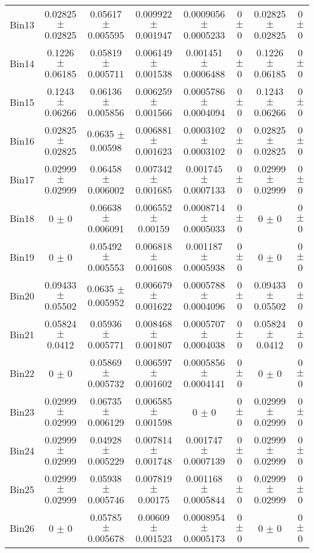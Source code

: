 \begin{tabular}{@{\extracolsep{4pt}}lccccccc@{}}
     Bin13 & 0.02825 $\pm$ 0.02825 & 0.05617 $\pm$ 0.005595 & 0.009922 $\pm$ 0.001947 & 0.0009056 $\pm$ 0.0005233 & 0 $\pm$ 0 & 0.02825 $\pm$ 0.02825 & 0 $\pm$ 0 \\ 
     Bin14 & 0.1226 $\pm$ 0.06185 & 0.05819 $\pm$ 0.005711 & 0.006149 $\pm$ 0.001538 & 0.001451 $\pm$ 0.0006488 & 0 $\pm$ 0 & 0.1226 $\pm$ 0.06185 & 0 $\pm$ 0 \\ 
     Bin15 & 0.1243 $\pm$ 0.06266 & 0.06136 $\pm$ 0.005856 & 0.006259 $\pm$ 0.001566 & 0.0005786 $\pm$ 0.0004094 & 0 $\pm$ 0 & 0.1243 $\pm$ 0.06266 & 0 $\pm$ 0 \\ 
     Bin16 & 0.02825 $\pm$ 0.02825 & 0.0635 $\pm$ 0.00598 & 0.006881 $\pm$ 0.001623 & 0.0003102 $\pm$ 0.0003102 & 0 $\pm$ 0 & 0.02825 $\pm$ 0.02825 & 0 $\pm$ 0 \\ 
     Bin17 & 0.02999 $\pm$ 0.02999 & 0.06458 $\pm$ 0.006002 & 0.007342 $\pm$ 0.001685 & 0.001745 $\pm$ 0.0007133 & 0 $\pm$ 0 & 0.02999 $\pm$ 0.02999 & 0 $\pm$ 0 \\ 
     Bin18 & 0 $\pm$ 0 & 0.06638 $\pm$ 0.006091 & 0.006552 $\pm$ 0.00159 & 0.0008714 $\pm$ 0.0005033 & 0 $\pm$ 0 & 0 $\pm$ 0 & 0 $\pm$ 0 \\ 
     Bin19 & 0 $\pm$ 0 & 0.05492 $\pm$ 0.005553 & 0.006818 $\pm$ 0.001608 & 0.001187 $\pm$ 0.0005938 & 0 $\pm$ 0 & 0 $\pm$ 0 & 0 $\pm$ 0 \\ 
     Bin20 & 0.09433 $\pm$ 0.05502 & 0.0635 $\pm$ 0.005952 & 0.006679 $\pm$ 0.001622 & 0.0005788 $\pm$ 0.0004096 & 0 $\pm$ 0 & 0.09433 $\pm$ 0.05502 & 0 $\pm$ 0 \\ 
     Bin21 & 0.05824 $\pm$ 0.0412 & 0.05936 $\pm$ 0.005771 & 0.008468 $\pm$ 0.001807 & 0.0005707 $\pm$ 0.0004038 & 0 $\pm$ 0 & 0.05824 $\pm$ 0.0412 & 0 $\pm$ 0 \\ 
     Bin22 & 0 $\pm$ 0 & 0.05869 $\pm$ 0.005732 & 0.006597 $\pm$ 0.001602 & 0.0005856 $\pm$ 0.0004141 & 0 $\pm$ 0 & 0 $\pm$ 0 & 0 $\pm$ 0 \\ 
     Bin23 & 0.02999 $\pm$ 0.02999 & 0.06735 $\pm$ 0.006129 & 0.006585 $\pm$ 0.001598 & 0 $\pm$ 0 & 0 $\pm$ 0 & 0.02999 $\pm$ 0.02999 & 0 $\pm$ 0 \\ 
     Bin24 & 0.02999 $\pm$ 0.02999 & 0.04928 $\pm$ 0.005229 & 0.007814 $\pm$ 0.001748 & 0.001747 $\pm$ 0.0007139 & 0 $\pm$ 0 & 0.02999 $\pm$ 0.02999 & 0 $\pm$ 0 \\ 
     Bin25 & 0.02999 $\pm$ 0.02999 & 0.05938 $\pm$ 0.005746 & 0.007819 $\pm$ 0.00175 & 0.001168 $\pm$ 0.0005844 & 0 $\pm$ 0 & 0.02999 $\pm$ 0.02999 & 0 $\pm$ 0 \\ 
     Bin26 & 0 $\pm$ 0 & 0.05785 $\pm$ 0.005678 & 0.00609 $\pm$ 0.001523 & 0.0008954 $\pm$ 0.0005173 & 0 $\pm$ 0 & 0 $\pm$ 0 & 0 $\pm$ 0 \\ 

\end{tabular}

